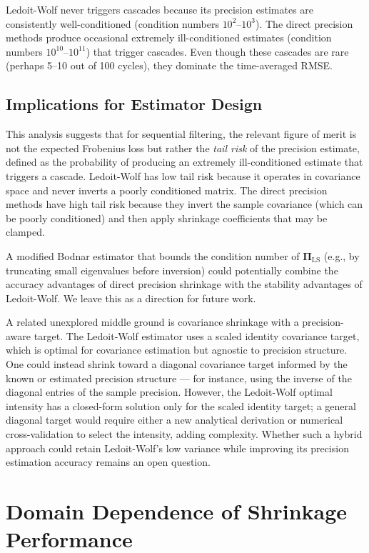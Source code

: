 Ledoit-Wolf never triggers cascades because its precision estimates are consistently well-conditioned (condition numbers $10^2$--$10^3$). The direct precision methods produce occasional extremely ill-conditioned estimates (condition numbers $10^{10}$--$10^{11}$) that trigger cascades. Even though these cascades are rare (perhaps 5--10 out of 100 cycles), they dominate the time-averaged RMSE.

\subsection{Implications for Estimator Design}
\label{sec:disc_design}

This analysis suggests that for sequential filtering, the relevant figure of merit is not the expected Frobenius loss but rather the \emph{tail risk} of the precision estimate, defined as the probability of producing an extremely ill-conditioned estimate that triggers a cascade. Ledoit-Wolf has low tail risk because it operates in covariance space and never inverts a poorly conditioned matrix. The direct precision methods have high tail risk because they invert the sample covariance (which can be poorly conditioned) and then apply shrinkage coefficients that may be clamped.

A modified Bodnar estimator that bounds the condition number of $\boldsymbol{\Pi}_{\text{LS}}$ (e.g., by truncating small eigenvalues before inversion) could potentially combine the accuracy advantages of direct precision shrinkage with the stability advantages of Ledoit-Wolf. We leave this as a direction for future work.

A related unexplored middle ground is covariance shrinkage with a precision-aware target. The Ledoit-Wolf estimator uses a scaled identity covariance target, which is optimal for covariance estimation but agnostic to precision structure. One could instead shrink toward a diagonal covariance target informed by the known or estimated precision structure --- for instance, using the inverse of the diagonal entries of the sample precision. However, the Ledoit-Wolf optimal intensity has a closed-form solution only for the scaled identity target; a general diagonal target would require either a new analytical derivation or numerical cross-validation to select the intensity, adding complexity. Whether such a hybrid approach could retain Ledoit-Wolf's low variance while improving its precision estimation accuracy remains an open question.

\section{Domain Dependence of Shrinkage Performance}
\label{sec:disc_domain}

